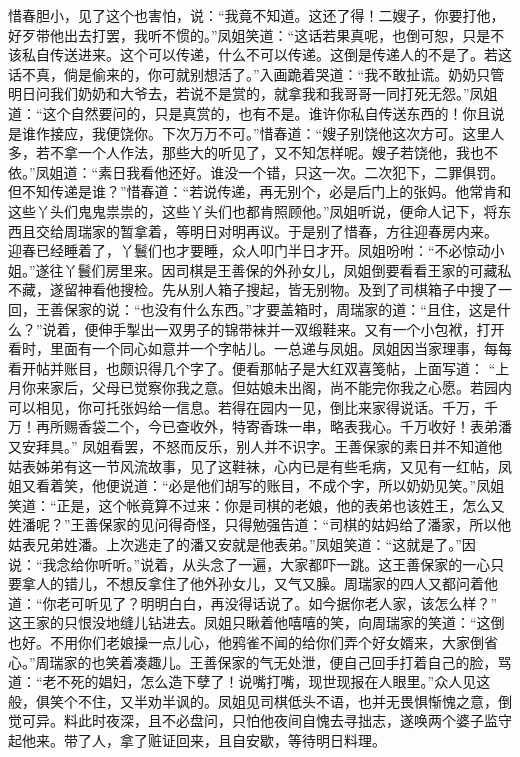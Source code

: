 \documentclass[12pt,oneside]{book}
\begin{document}
惜春胆小，见了这个也害怕，说：“我竟不知道。这还了得！二嫂子，你要打他，好歹带他出去打罢，我听不惯的。”凤姐笑道：“这话若果真呢，也倒可恕，只是不该私自传送进来。这个可以传递，什么不可以传递。这倒是传递人的不是了。若这话不真，倘是偷来的，你可就别想活了。”入画跪着哭道：“我不敢扯谎。奶奶只管明日问我们奶奶和大爷去，若说不是赏的，就拿我和我哥哥一同打死无怨。”凤姐道：“这个自然要问的，只是真赏的，也有不是。谁许你私自传送东西的！你且说是谁作接应，我便饶你。下次万万不可。”惜春道：“嫂子别饶他这次方可。这里人多，若不拿一个人作法，那些大的听见了，又不知怎样呢。嫂子若饶他，我也不依。”凤姐道：“素日我看他还好。谁没一个错，只这一次。二次犯下，二罪俱罚。但不知传递是谁？”惜春道：“若说传递，再无别个，必是后门上的张妈。他常肯和这些丫头们鬼鬼祟祟的，这些丫头们也都肯照顾他。”凤姐听说，便命人记下，将东西且交给周瑞家的暂拿着，等明日对明再议。于是别了惜春，方往迎春房内来。
迎春已经睡着了，丫鬟们也才要睡，众人叩门半日才开。凤姐吩咐：“不必惊动小姐。”遂往丫鬟们房里来。因司棋是王善保的外孙女儿，凤姐倒要看看王家的可藏私不藏，遂留神看他搜检。先从别人箱子搜起，皆无别物。及到了司棋箱子中搜了一回，王善保家的说：“也没有什么东西。”才要盖箱时，周瑞家的道：“且住，这是什么？”说着，便伸手掣出一双男子的锦带袜并一双缎鞋来。又有一个小包袱，打开看时，里面有一个同心如意并一个字帖儿。一总递与凤姐。凤姐因当家理事，每每看开帖并账目，也颇识得几个字了。便看那帖子是大红双喜笺帖，上面写道：
“上月你来家后，父母已觉察你我之意。但姑娘未出阁，尚不能完你我之心愿。若园内可以相见，你可托张妈给一信息。若得在园内一见，倒比来家得说话。千万，千万！再所赐香袋二个，今已查收外，特寄香珠一串，略表我心。千万收好！表弟潘又安拜具。”
凤姐看罢，不怒而反乐，别人并不识字。王善保家的素日并不知道他姑表姊弟有这一节风流故事，见了这鞋袜，心内已是有些毛病，又见有一红帖，凤姐又看着笑，他便说道：“必是他们胡写的账目，不成个字，所以奶奶见笑。”凤姐笑道：“正是，这个帐竟算不过来：你是司棋的老娘，他的表弟也该姓王，怎么又姓潘呢？”王善保家的见问得奇怪，只得勉强告道：“司棋的姑妈给了潘家，所以他姑表兄弟姓潘。上次逃走了的潘又安就是他表弟。”凤姐笑道：“这就是了。”因说：“我念给你听听。”说着，从头念了一遍，大家都吓一跳。这王善保家的一心只要拿人的错儿，不想反拿住了他外孙女儿，又气又臊。周瑞家的四人又都问着他道：“你老可听见了？明明白白，再没得话说了。如今据你老人家，该怎么样？”
这王家的只恨没地缝儿钻进去。凤姐只瞅着他嘻嘻的笑，向周瑞家的笑道：“这倒也好。不用你们老娘操一点儿心，他鸦雀不闻的给你们弄个好女婿来，大家倒省心。”周瑞家的也笑着凑趣儿。王善保家的气无处泄，便自己回手打着自己的脸，骂道：“老不死的娼妇，怎么造下孽了！说嘴打嘴，现世现报在人眼里。”众人见这般，俱笑个不住，又半劝半讽的。凤姐见司棋低头不语，也并无畏惧惭愧之意，倒觉可异。料此时夜深，且不必盘问，只怕他夜间自愧去寻拙志，遂唤两个婆子监守起他来。带了人，拿了赃证回来，且自安歇，等待明日料理。
\end{document}
